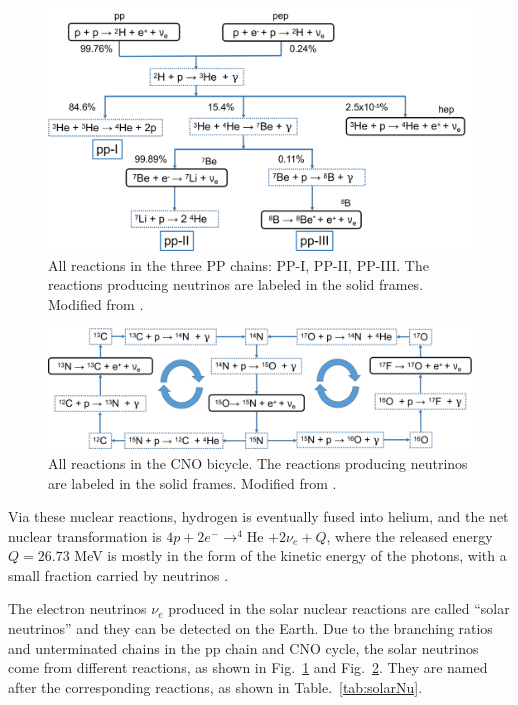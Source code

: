 \begin{figure}[htbp]
	\centering	
	\includegraphics[width=14cm]{ppChain.png}
	\caption[All reactions in the three PP chains.]{All reactions in the three PP chains: PP-I, PP-II, PP-III. The reactions producing neutrinos are labeled in the solid frames. Modified from \cite{oberauer2020solar}.	\label{fig:ppChain}}
\end{figure}

\begin{figure}[htbp]
	\centering	
	\includegraphics[width=14cm]{CNOcycle.png}
	\caption[All reactions in the CNO bicycle.]{All reactions in the CNO bicycle. The reactions producing neutrinos are labeled in the solid frames. Modified from \cite{oberauer2020solar}.	\label{fig:CNOcycle}}
\end{figure}

Via these nuclear reactions, hydrogen is eventually fused into helium, and the net nuclear transformation is $4p+2e^-\to^{4}$He $+2\nu_e+Q$, where the released energy $Q=26.73$ MeV is mostly in the form of the kinetic energy of the photons, with a small fraction carried by neutrinos  \cite{antonio2018state,valle2015neutrinos}.

The electron neutrinos $\nu_e$ produced in the solar nuclear reactions are called ``solar neutrinos'' and they can be detected on the Earth. Due to the branching ratios and unterminated chains in the pp chain and CNO cycle, the solar neutrinos come from different reactions, as shown in Fig.~\ref{fig:ppChain} and Fig.~\ref{fig:CNOcycle}. They are named after the corresponding reactions, as shown in Table.~\ref{tab:solarNu}.


